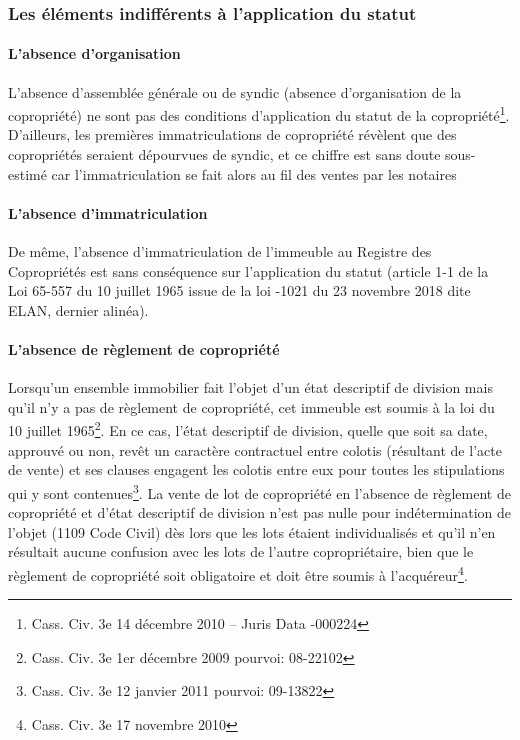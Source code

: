 		\subsubsection{Les éléments indifférents à l’application du statut}
		
			\paragraph{L’absence d’organisation}
			
			L’absence d’assemblée générale ou de syndic (absence d’organisation de la copropriété) ne sont pas des
			conditions d’application du statut de la copropriété\footnote{Cass. Civ. 3e 14 décembre 2010 – Juris Data -000224}. D’ailleurs, les premières immatriculations de	copropriété révèlent que  des copropriétés seraient dépourvues de syndic, et ce chiffre est sans doute sous- estimé car l’immatriculation se fait alors au fil des ventes par les notaires
			
			\paragraph{L’absence d’immatriculation}
			
			De même, l’absence d’immatriculation de l’immeuble au Registre des Copropriétés est sans conséquence
			sur l’application du statut (article 1-1 de la Loi 65-557 du 10 juillet 1965 issue de la loi -1021 du 23
			novembre 2018 dite ELAN, dernier alinéa).
			
			\paragraph{L’absence de règlement de copropriété}
			
			Lorsqu’un ensemble immobilier fait l’objet d’un état descriptif de division mais qu’il n’y a pas de règlement
			de copropriété, cet immeuble est soumis à la loi du 10 juillet 1965\footnote{Cass. Civ. 3e 1er décembre 2009 pourvoi: 08-22102}. En ce cas, l’état descriptif de division, quelle que soit sa date, approuvé ou non, revêt un caractère contractuel entre colotis (résultant de l’acte de vente) et ses clauses engagent les colotis entre eux pour toutes les stipulations qui y sont contenues\footnote{Cass. Civ. 3e 12 janvier 2011 pourvoi: 09-13822}.
			La vente de lot de copropriété en l’absence de règlement de copropriété et d’état descriptif de division
			n’est pas nulle pour indétermination de l’objet (1109 Code Civil) dès lors que les lots étaient individualisés
			et qu'il n'en résultait aucune confusion avec les lots de l'autre copropriétaire, bien que le règlement de
			copropriété soit obligatoire et doit être soumis à l’acquéreur\footnote{Cass. Civ. 3e 17 novembre 2010}.
	

